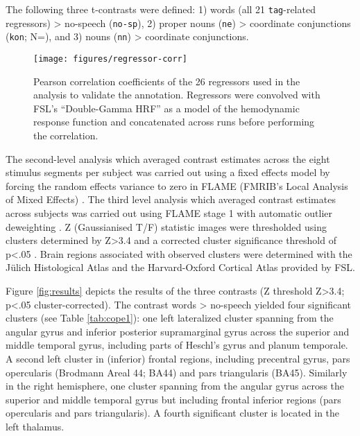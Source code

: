 \documentclass[10pt,a4paper,onecolumn]{article}
\begin{document}
The following three t-contrasts were defined:
1) words (all 21 \texttt{tag}-related regressors) > no-speech (\texttt{no-sp}),
2) proper nouns (\texttt{ne}) > coordinate conjunctions (\texttt{kon}; N=\rKonAll), and
3) nouns (\texttt{nn}) > coordinate conjunctions.

\begin{figure*} \centering
\texttt{[image: figures/regressor-corr]}
\caption{Pearson correlation coefficients of the 26 regressors used in the
    analysis to validate the annotation.
    Regressors were convolved with FSL's ``Double-Gamma HRF'' as a model of the
    hemodynamic response function and concatenated across runs before
    performing the correlation.}
\label{fig:reg-corr} \end{figure*}


The second-level analysis which averaged contrast estimates across the eight
stimulus segments per subject was carried out using a fixed effects model by
forcing the random effects variance to zero in FLAME (FMRIB's Local Analysis of
Mixed Effects) \citep{beckmann2003general, woolrich2004multilevel}.
The third level analysis which averaged contrast estimates across subjects was
carried out using FLAME stage 1 with automatic outlier deweighting
\citep{woolrich2004multilevel, woolrich2008robust}.
Z (Gaussianised T/F) statistic images were thresholded using clusters determined
by Z>3.4 and a corrected cluster significance threshold of p<.05
\citep{woolrich2008robust}.
Brain regions associated with observed clusters were determined with the Jülich
Histological Atlas \citep{eickhoff2005toolbox,eickhoff2007assignment} and the
Harvard-Oxford Cortical Atlas \citep{desikan2006automated} provided by FSL.


Figure \ref{fig:results} depicts the results of the three contrasts (Z threshold
Z>3.4; p<.05 cluster-corrected).
The contrast words > no-speech yielded four significant clusters (see Table
\ref{tab:cope1}):
one left lateralized cluster spanning from the angular gyrus and inferior
posterior supramarginal gyrus across the superior and middle temporal gyrus,
including parts of Heschl's gyrus and planum temporale.
A second left cluster in (inferior) frontal regions, including precentral gyrus,
pars opercularis (Brodmann Areal 44; BA44) and pars triangularis (BA45).
Similarly in the right hemisphere, one cluster spanning from the angular gyrus
across the superior and middle temporal gyrus but including frontal inferior
regions (pars opercularis and pars triangularis).
A fourth significant cluster is located in the left thalamus.
\end{document}
